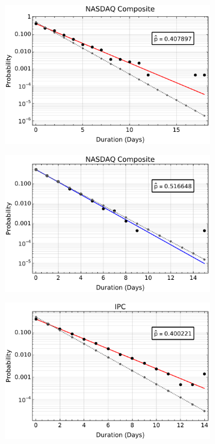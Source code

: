 \documentclass[a4paper]{jpconf}
\begin{document}
\begin{figure}[h!tb]
\begin{subfigure}[b]{0.45\textwidth}
            \includegraphics[width=\textwidth]{img/dist_pos_NASDAQ.pdf}
            \caption[]{}      
        \end{subfigure}
        \quad
        \begin{subfigure}[b]{0.45\textwidth}   
            \centering 
            \includegraphics[width=\textwidth]{img/dist_neg_NASDAQ.pdf}
            \caption[]{}      
        \end{subfigure}
        \begin{subfigure}[b]{0.45\textwidth}
            \centering
            \includegraphics[width=\textwidth]{img/dist_pos_IPC.pdf}

\end{subfigure}
\end{figure}
\end{document}
